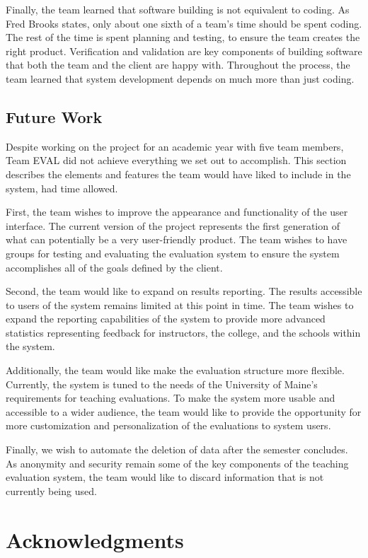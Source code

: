 \documentclass{article}
\begin{document}
Finally, the team learned that software building is not equivalent to coding. As Fred Brooks states, only about one sixth of a team's time should be spent coding. The rest of the time is spent planning and testing, to ensure the team creates the right product. Verification and validation are key components of building software that both the team and the client are happy with. Throughout the process, the team learned that system development depends on much more than just coding. 

\subsection{Future Work}

Despite working on the project for an academic year with five team members, Team EVAL did not achieve everything we set out to accomplish. This section describes the elements and features the team would have liked to include in the system, had time allowed. 

First, the team wishes to improve the appearance and functionality of the user interface. The current version of the project represents the first generation of what can potentially be a very user-friendly product. The team wishes to have groups for testing and evaluating the evaluation system to ensure the system accomplishes all of the goals defined by the client. 

Second, the team would like to expand on results reporting. The results accessible to users of the system remains limited at this point in time. The team wishes to expand the reporting capabilities of the system to provide more advanced statistics representing feedback for instructors, the college, and the schools within the system. 

Additionally, the team would like make the evaluation structure more flexible. Currently, the system is tuned to the needs of the University of Maine's requirements for teaching evaluations. To make the system more usable and accessible to a wider audience, the team would like to provide the opportunity for more customization and personalization of the evaluations to system users. 

Finally, we wish to automate the deletion of data after the semester concludes. As anonymity and security remain some of the key components of the teaching evaluation system, the team would like to discard information that is not currently being used. 

\section{Acknowledgments}
\end{document}
